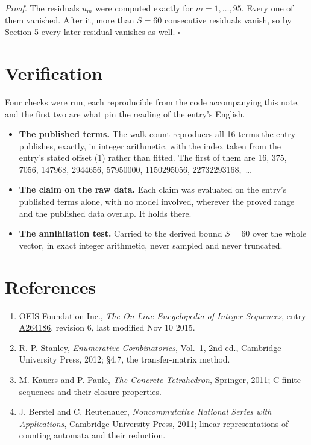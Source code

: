 \documentclass[11pt]{article}
\theoremstyle{definition}
\begin{document}
{\itshape Proof.} The residuals $u_m$ were computed exactly for $m = 1,\dots,95$. Every one of them vanished. After it, more than $S = 60$ consecutive residuals vanish, so by Section 5 every later residual vanishes as well. $\square$

\section{Verification}

Four checks were run, each reproducible from the code accompanying this note, and the first two are what pin the reading of the entry's English.

\begin{itemize}

\item {\bfseries The published terms.} The walk count reproduces all 16 terms the entry publishes, exactly, in integer arithmetic, with the index taken from the entry's stated offset (1) rather than fitted. The first of them are 16, 375, 7056, 147968, 2944656, 57950000, 1150295056, 22732293168,~\dots

\item {\bfseries The claim on the raw data.} Each claim was evaluated on the entry's published terms alone, with no model involved, wherever the proved range and the published data overlap. It holds there.

\item {\bfseries The annihilation test.} Carried to the derived bound $S = 60$ over the whole vector, in exact integer arithmetic, never sampled and never truncated.

\end{itemize}

\section{References}

\begin{enumerate}

\item OEIS Foundation Inc., \emph{The On-Line Encyclopedia of Integer Sequences}, entry \href{https://oeis.org/A264186}{A264186}, revision 6, last modified Nov 10 2015.

\item R. P. Stanley, \emph{Enumerative Combinatorics}, Vol.~1, 2nd ed., Cambridge University Press, 2012; \S4.7, the transfer-matrix method.

\item M. Kauers and P. Paule, \emph{The Concrete Tetrahedron}, Springer, 2011; C-finite sequences and their closure properties.

\item J. Berstel and C. Reutenauer, \emph{Noncommutative Rational Series with Applications}, Cambridge University Press, 2011; linear representations of counting automata and their reduction.

\end{enumerate}
\end{document}
